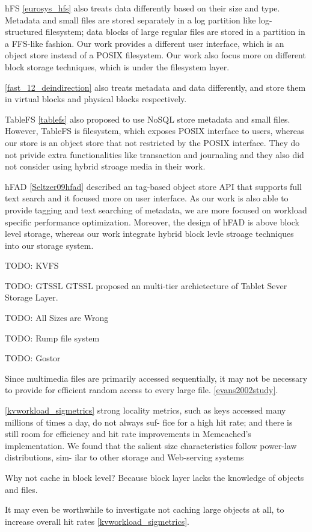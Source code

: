 hFS \ref{eurosys_hfs} also treats data differently based on their size and
type. Metadata and small files are stored separately in a log partition like
log-structured filesystem; data blocks of large regular files are stored in a
partition in a FFS-like fashion. Our work provides a different user interface,
which is an object store instead of a POSIX filesystem. Our work also focus
more on different block storage techniques, which is under the filesystem
layer.

\ref{fast_12_deindirection} also treats metadata and data differently, and
store them in virtual blocks and physical blocks respectively.

TableFS \ref{tablefs} also proposed to use NoSQL store metadata and small
files. However, TableFS is filesystem, which exposes POSIX interface to users,
whereas our store is an object store that not restricted by the POSIX
interface.  They do not privide extra functionalities like transaction and
journaling and they also did not consider using hybrid stroage media in their
work.

hFAD \ref{Seltzer09hfad} described an tag-based object store API that supports
full text search and it focused more on user interface. As our work is also
able to provide tagging and text searching of metadata, we are more focused on
workload specific performance optimization. Moreover, the design of hFAD is
above block level storage, whereas our work integrate hybrid block levle
stroage techniques into our storage system.

TODO: KVFS

TODO: GTSSL
GTSSL proposed an multi-tier archietecture of Tablet Sever Storage Layer.

TODO: All Sizes are Wrong

TODO: Rump file system

TODO: Gostor

Since multimedia files are primarily accessed sequentially, it may not be
necessary to provide for efficient random access to every large file.
\ref{evans2002study}.

\ref{kvworkload_sigmetrics} strong locality metrics, such as keys accessed many
millions of times a day, do not always suf- fice for a high hit rate; and there
is still room for efficiency and hit rate improvements in Memcached’s
implementation.  We found that the salient size characteristics follow
power-law distributions, sim- ilar to other storage and Web-serving systems

Why not cache in block level? Because block layer lacks the knowledge of
objects and files.  

It may even be worthwhile to investigate not caching large objects at all, to
increase overall hit rates \ref{kvworkload_sigmetrics}.
